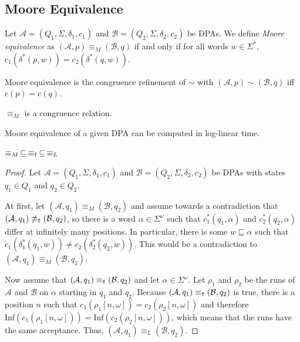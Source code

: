 \vspace{5pt}

\subsection{Moore Equivalence}

\begin{defn}
	Let $\mathcal{A} = (Q_1, \Sigma, \delta_1, c_1)$ and $\mathcal{B} = (Q_2, \Sigma, \delta_2, c_2)$ be DPAs. We define \emph{Moore equivalence} as $(\mathcal{A}, p) \equiv_M (\mathcal{B}, q)$ if and only if for all words $w \in \Sigma^*$, $c_1(\delta^*(p, w)) = c_2(\delta^*(q, w))$.
\end{defn}

\begin{lem}
	Moore equivalence is the congruence refinement of $\sim$ with $(\mathcal{A}, p) \sim (\mathcal{B}, q)$ iff $c(p) = c(q)$.
\end{lem}

\begin{cor}
	$\equiv_M$ is a congruence relation.
	\label{cor:general:M_congruence}
\end{cor}

\begin{cor}
	Moore equivalence of a given DPA can be computed in log-linear time.
	\label{cor:general:M_loglin}
\end{cor}


\vspace{10pt}

\begin{theorem}
	$\equiv_M \,\subseteq\, \equiv_\text{\Ankh} \,\subseteq\, \equiv_L$
	\label{thm:general:M_subs_Ankh_subs_L}
\end{theorem}

\begin{proof}
	Let $\mathcal{A} = (Q_1, \Sigma, \delta_1, c_1)$ and $\mathcal{B} = (Q_2, \Sigma, \delta_2, c_2)$ be DPAs with states $q_1 \in Q_1$ and $q_2 \in Q_2$. 
	
	At first, let $(\mathcal{A}, q_1) \equiv_M (\mathcal{B}, q_2)$ and assume towards a contradiction that $(\mathcal{A}, q_1) \not\equiv_\text{\Ankh} (\mathcal{B}, q_2)$, so there is a word $\alpha \in \Sigma^\omega$ such that $c_1^*(q_1, \alpha)$ and $c_2^*(q_2, \alpha)$ differ at infinitely many positions. In particular, there is some $w \sqsubseteq \alpha$ such that $c_1(\delta_1^*(q_1, w)) \neq c_2(\delta_2^*(q_2, w))$. This would be a contradiction to $(\mathcal{A}, q_1) \equiv_M (\mathcal{B}, q_2)$.
	
	Now assume that $(\mathcal{A}, q_1) \equiv_\text{\Ankh} (\mathcal{B}, q_2)$ and let $\alpha \in \Sigma^\omega$. Let $\rho_1$ and $\rho_2$ be the runs of $\mathcal{A}$ and $\mathcal{B}$ on $\alpha$ starting in $q_1$ and $q_2$. Because $(\mathcal{A}, q_1) \equiv_\text{\Ankh} (\mathcal{B}, q_2)$ is true, there is a position $n$ such that $c_1(\rho_1[n,\omega]) = c_2(\rho_2[n,\omega])$ and therefore $\text{Inf}(c_1(\rho_1[n,\omega])) = \text{Inf}(c_2(\rho_2[n,\omega]))$, which means that the runs have the same acceptance. Thus, $(\mathcal{A}, q_1) \equiv_L (\mathcal{B}, q_2)$.
\end{proof}






